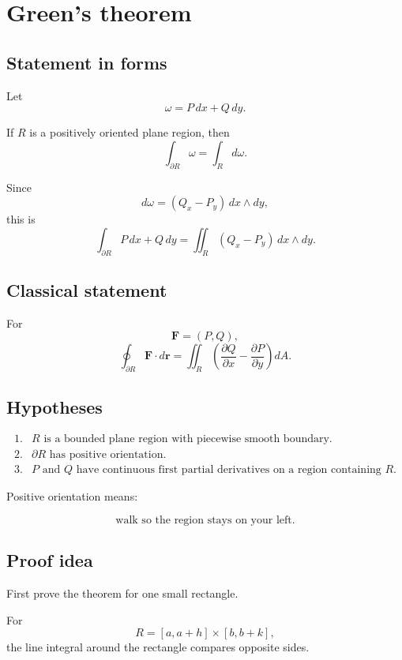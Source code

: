 \section{Green's theorem}
\label{app:F.4}

\subsection*{Statement in forms}

Let
\[
    \omega=P\,dx+Q\,dy.
\]

If \(R\) is a positively oriented plane region, then
\[
\boxed{
    \int_{\partial R}\omega
    =
    \int_R d\omega.
}
\]

Since
\[
    d\omega=(Q_x-P_y)\,dx\wedge dy,
\]
this is
\[
\boxed{
    \int_{\partial R}P\,dx+Q\,dy
    =
    \iint_R (Q_x-P_y)\,dx\wedge dy.
}
\]

\subsection*{Classical statement}

For
\[
    \mathbf F=(P,Q),
\]
\[
\boxed{
    \oint_{\partial R}\mathbf F\cdot d\mathbf r
    =
    \iint_R
    \left(
        \frac{\partial Q}{\partial x}
        -
        \frac{\partial P}{\partial y}
    \right)
    dA.
}
\]

\subsection*{Hypotheses}

\[
\begin{array}{ll}
1. & R\text{ is a bounded plane region with piecewise smooth boundary.}\\[1mm]
2. & \partial R\text{ has positive orientation.}\\[1mm]
3. & P\text{ and }Q\text{ have continuous first partial derivatives on a region containing }R.
\end{array}
\]

Positive orientation means:

\[
\boxed{
    \text{walk so the region stays on your left.}
}
\]

\subsection*{Proof idea}

First prove the theorem for one small rectangle.

For
\[
    R=[a,a+h]\times[b,b+k],
\]
the line integral around the rectangle compares opposite sides.

